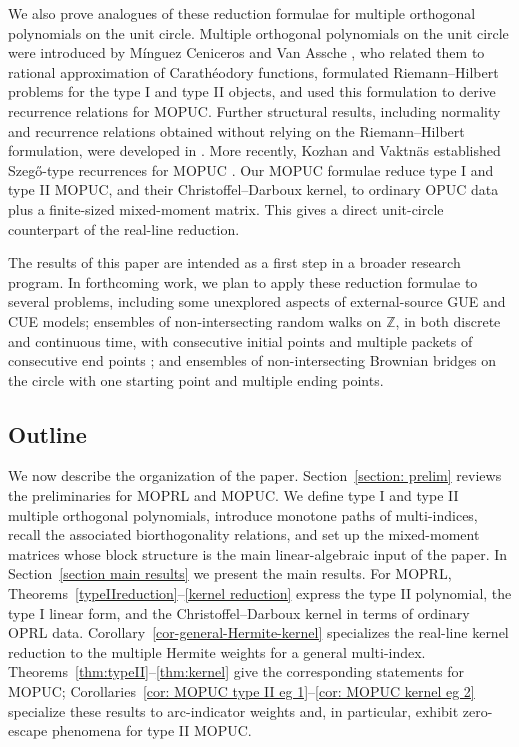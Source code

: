 \documentclass[a4paper,10pt,leqno]{amsart}
\numberwithin{equation}{section}
\theoremstyle{remark}
\begin{document}
We also prove analogues of these reduction formulae for multiple orthogonal
polynomials on the unit circle.  Multiple orthogonal polynomials on the unit
circle were introduced by Mínguez Ceniceros and Van Assche \cite{MCVA08}, who
related them to rational approximation of Carathéodory functions,
formulated Riemann--Hilbert problems for the type I and type II objects, and
used this formulation to derive recurrence relations for MOPUC.  Further
structural results, including normality and recurrence relations obtained
without relying on the Riemann--Hilbert formulation, were developed in
\cite{CBDMO15}.  More recently, Kozhan and Vaktnäs established Szegő-type
recurrences for MOPUC \cite{KV24a}.  Our MOPUC
formulae reduce type I and type II MOPUC, and their Christoffel--Darboux kernel,
to ordinary OPUC data plus a finite-sized mixed-moment matrix.  This gives a direct unit-circle counterpart of the real-line reduction.

The results of this paper are intended as a first step in a broader research program. In forthcoming work, we plan to apply these reduction formulae to several problems, including some unexplored aspects of external-source GUE and CUE models; ensembles of non-intersecting random walks on $\mathbb Z$, in both discrete and continuous time, with consecutive initial points and multiple packets of consecutive end points \cite{GL}; and ensembles of non-intersecting Brownian bridges on the circle \cite{BuckinghamLiechty17} with one starting point and multiple ending points.


\subsection{Outline} We now describe the organization of the paper.  Section~\ref{section: prelim} reviews the
preliminaries for MOPRL and MOPUC.  We define type I and type II multiple
orthogonal polynomials, introduce monotone paths of multi-indices, recall the
associated biorthogonality relations, and set up the mixed-moment matrices whose
block structure is the main linear-algebraic input of the paper. In Section~\ref{section main results}
we present the main results.  For MOPRL, Theorems~\ref{typeIIreduction}--\ref{kernel reduction} express the
type II polynomial, the type I linear form, and the Christoffel--Darboux kernel
in terms of ordinary OPRL data. Corollary~\ref{cor-general-Hermite-kernel} specializes the real-line kernel reduction to the multiple Hermite weights for a general multi-index.  Theorems~\ref{thm:typeII}--\ref{thm:kernel} give the corresponding
statements for MOPUC; Corollaries~\ref{cor: MOPUC type II eg 1}--\ref{cor: MOPUC kernel eg 2}
specialize these results to arc-indicator weights and, in particular, exhibit
zero-escape phenomena for type II MOPUC.
\end{document}
